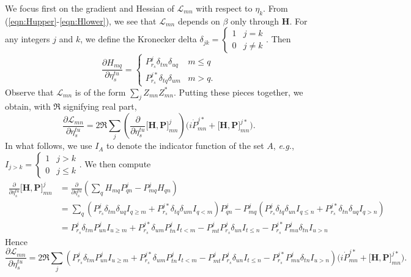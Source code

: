 \documentclass[10pt]{article}
\begin{document}
We focus first on the gradient and Hessian of $\mathcal{L}_{mn}$ with respect to $\eta_{k}$.  From (\ref{eqn:Hupper}-\ref{eqn:Hlower}), we see that $\mathcal{L}_{mn}$ depends on $\beta$ only through $\mathbf{H}$.  For any integers $j$ and $k$, we define the Kronecker delta $\delta_{jk} = \begin{cases} 1 & j = k \\ 0 & j \neq k \end{cases}$.  Then
\[
\frac{\partial H_{mq}}{\partial \eta_s^{tu}}  = \begin{cases} P_{r_s}^j \delta_{tm} \delta_{uq} & m \leq q \\
 P_{r_s}^{j\ast} \delta_{tq} \delta_{um} & m > q. \end{cases}
\]
Observe that $\mathcal{L}_{mn}$ is of the form $\sum_{j} Z_{mn} Z_{mn}^\ast$.  Putting these pieces together, we obtain, with $\Re$ signifying real part,
\begin{equation}
\label{eqn:lossmnpart}
\frac{\partial \mathcal{L}_{mn}}{\partial \eta_{s}^{tu}} = 2 \Re \sum_{j} \left( \frac{\partial}{\partial \eta_{s}^{tu}} \big [  \mathbf{H} , \mathbf{P} \big]^j_{mn} \right) \biggl( i  \dot{P}^{j \ast}_{mn}
    + \big [  \mathbf{H} , \mathbf{P} \big]^{j \ast}_{mn} \biggr).
\end{equation}
In what follows, we use $I_A$ to denote the indicator function of the set $A$, {\it e.g.}, $I_{j>k} = \begin{cases} 1 & j > k \\ 0 & j \leq k\end{cases}$. We then compute
\begin{align*}
\frac{\partial}{\partial \eta_{s}^{tu}} \big [  \mathbf{H} , \mathbf{P} \big]^j_{mn} &= \frac{\partial}{\partial \eta_{s}^{tu}} \left( \sum_{q} H_{mq} P^j_{qn} - P^j_{mq} H_{qn} \right) \\
 &= \sum_q \left( P_{r_s}^j \delta_{tm} \delta_{uq} I_{q \geq m} + P_{r_s}^{j\ast} \delta_{tq} \delta_{um} I_{q < m} \right) P^j_{qn} - P^j_{mq} \left( P_{r_s}^j \delta_{tq} \delta_{un} I_{q \leq n} + P_{r_s}^{j\ast} \delta_{tn} \delta_{uq} I_{q > n} \right) \\
 &= P_{r_s}^j \delta_{tm} P^j_{un} I_{u \geq m} + P_{r_s}^{j\ast} \delta_{um} P^j_{tn}  I_{t < m} - P^j_{mt} P_{r_s}^j  \delta_{un} I_{t \leq n} - P_{r_s}^{j\ast} P_{mu}^j \delta_{tn} I_{u>n}
\end{align*}
Hence
\[
\frac{\partial \mathcal{L}_{mn}}{\partial \eta_{s}^{tu}} = 2 \Re \sum_{j} \left( P_{r_s}^j \delta_{tm} P^j_{un} I_{u \geq m} + P_{r_s}^{j\ast} \delta_{um} P^j_{tn}  I_{t < m} - P^j_{mt} P_{r_s}^j  \delta_{un} I_{t \leq n} - P_{r_s}^{j\ast} P_{mu}^j \delta_{tn} I_{u>n} \right) \biggl( i  \dot{P}^{j \ast}_{mn}
    + \big [  \mathbf{H} , \mathbf{P} \big]^{j \ast}_{mn} \biggr).
\]
\end{document}
